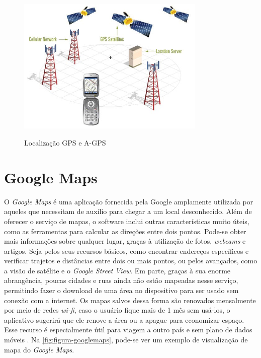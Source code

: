 \begin{figure}[H]
    \centering
    \caption{Localização GPS e A-GPS}
    \includegraphics[width=0.8\textwidth]{./dados/figuras/fig5}
    \label{fig:figura-localizacaoGpsAgps}
\end{figure}

\section{Google Maps}

O \textit{Google Maps} é uma aplicação fornecida pela Google amplamente utilizada por aqueles que necessitam de auxílio para chegar a um local desconhecido. Além de oferecer o serviço de mapas, o software inclui outras características muito úteis, como as ferramentas para calcular as direções entre dois pontos. Pode-se obter mais informações sobre qualquer lugar, graças à utilização de fotos, \textit{webcams} e artigos. Seja pelos seus recursos básicos, como encontrar endereços específicos e verificar trajetos e distâncias entre dois ou mais pontos, ou pelos avançados, como a visão de satélite e o \textit{Google Street View}. Em parte, graças à sua enorme abrangência, poucas cidades e ruas ainda não estão mapeadas nesse serviço, permitindo fazer o download de uma área no dispositivo para ser usado sem conexão com a internet. Os mapas salvos dessa forma são renovados mensalmente por meio de redes \textit{wi-fi}, caso o usuário fique mais de 1 mês sem usá-los, o aplicativo sugerirá que ele renove a área ou a apague para economizar espaço. Esse recurso é especialmente útil para viagem a outro país e sem plano de dados móveis \cite{google:2019}. Na \autoref{fig:figura-googlemaps}, pode-se ver um exemplo de visualização de mapa do \textit{Google Maps}.

